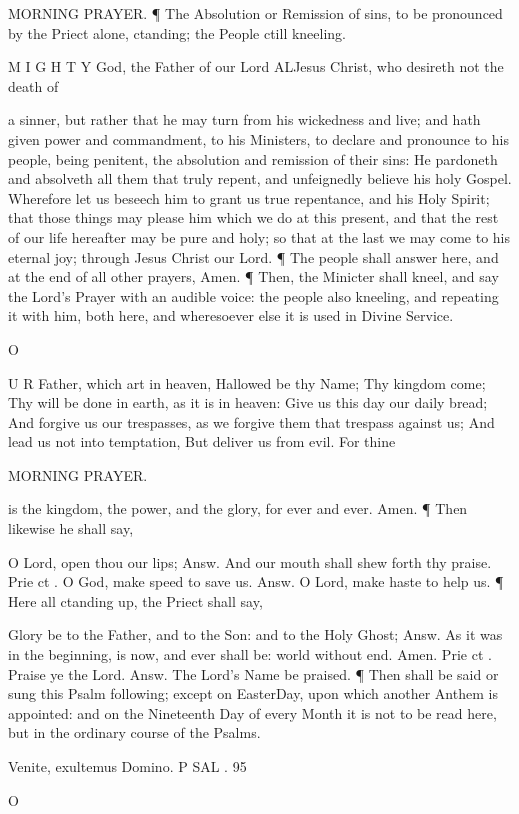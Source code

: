 MORNING PRAYER. ¶ The Absolution or Remission of sins, to be pronounced by the Priect alone, ctanding; the People ctill kneeling.

M I G H T Y God, the Father of our Lord ALJesus Christ, who desireth not the death of

a sinner, but rather that he may turn from his wickedness and live; and hath given power and commandment, to his Ministers, to declare and pronounce to his people, being penitent, the absolution and remission of their sins: He pardoneth and absolveth all them that truly repent, and unfeignedly believe his holy Gospel. Wherefore let us beseech him to grant us true repentance, and his Holy Spirit; that those things may please him which we do at this present, and that the rest of our life hereafter may be pure and holy; so that at the last we may come to his eternal joy; through Jesus Christ our Lord. ¶ The people shall answer here, and at the end of all other prayers, Amen. ¶ Then, the Minicter shall kneel, and say the Lord’s Prayer with an audible voice: the people also kneeling, and repeating it with him, both here, and wheresoever else it is used in Divine Service.

O

U R Father, which art in heaven, Hallowed be thy Name; Thy kingdom come; Thy will be done in earth, as it is in heaven: Give us this day our daily bread; And forgive us our trespasses, as we forgive them that trespass against us; And lead us not into temptation, But deliver us from evil. For thine

MORNING PRAYER.

is the kingdom, the power, and the glory, for ever and ever. Amen. ¶ Then likewise he shall say,

O Lord, open thou our lips; Answ. And our mouth shall shew forth thy praise. Prie ct . O God, make speed to save us. Answ. O Lord, make haste to help us. ¶ Here all ctanding up, the Priect shall say,

Glory be to the Father, and to the Son: and to the Holy Ghost; Answ. As it was in the beginning, is now, and ever shall be: world without end. Amen. Prie ct . Praise ye the Lord. Answ. The Lord’s Name be praised. ¶ Then shall be said or sung this Psalm following; except on EasterDay, upon which another Anthem is appointed: and on the Nineteenth Day of every Month it is not to be read here, but in the ordinary course of the Psalms.

Venite, exultemus Domino. P SAL . 95

O

